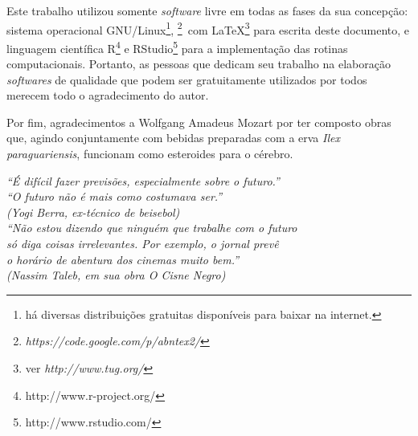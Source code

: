 \documentclass[
	12pt,				%
	openright,			%
	oneside,			%
	a4paper,			%
	english,			%
	brazil				%
	]{dissertacao-ufrgs-abntex2}
\begin{document}

\begin{agradecimentos}

%

Este trabalho utilizou somente \emph{software} livre em todas as fases da sua concepção: sistema operacional GNU/Linux\footnote{há diversas distribuições gratuitas disponíveis para baixar na internet. }, \abnTeX \footnote{\emph{https://code.google.com/p/abntex2/}}~com \LaTeX \footnote{ver \emph{http://www.tug.org/}} para escrita deste documento, e linguagem científica R\footnote{http://www.r-project.org/} e RStudio\footnote{http://www.rstudio.com/} para a implementação das rotinas computacionais.
Portanto, as pessoas que dedicam seu trabalho na elaboração \emph{softwares} de qualidade que podem ser gratuitamente utilizados por todos merecem todo o agradecimento do autor.

Por fim, agradecimentos a Wolfgang Amadeus Mozart por ter composto obras que, agindo conjuntamente com bebidas preparadas com a erva \emph{Ilex paraguariensis}, funcionam como esteroides para o cérebro.

\end{agradecimentos}

\begin{epigrafe}
    \vspace*{\fill}
	\begin{flushright}
		\textit{
		``É difícil fazer previsões, especialmente sobre o futuro.''\\
		``O futuro não é mais como costumava ser.'' \\
		(Yogi Berra, ex-técnico de beisebol)\\ [1cm]
		``Não estou dizendo que ninguém que trabalhe com o futuro\\
		só diga coisas irrelevantes. Por exemplo, o jornal prevê \\
		o horário de abentura dos cinemas muito bem.'' \\		
		(Nassim Taleb, em sua obra \emph{O Cisne Negro})
		}
	\end{flushright}
\end{epigrafe}
\end{document}
